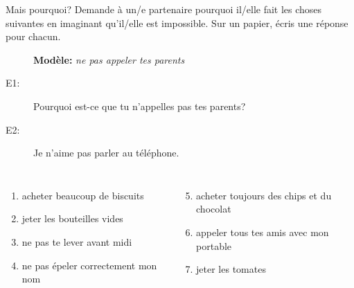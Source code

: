 \begin{frame}{Mais pourquoi?}
  Demande à un/e partenaire pourquoi il/elle fait les choses suivantes en imaginant qu'il/elle est impossible.
  Sur un papier, écris une réponse pour chacun. \\
  \begin{description}
    \item[] \textbf{Modèle:} \emph{ne pas appeler tes parents}
    \item[E1:] Pourquoi est-ce que tu n'appelles pas tes parents?
    \item[E2:] Je n'aime pas parler au téléphone.
  \end{description}
  \begin{columns}[t]
      \begin{enumerate}
        \item acheter beaucoup de biscuits
        \item jeter les bouteilles vides 
        \item ne pas te lever avant midi
        \item ne pas épeler correctement mon nom
      \end{enumerate}
      \begin{enumerate}
        \setcounter{enumi}{4}
        \item acheter toujours des chips et du chocolat
        \item appeler tous tes amis avec mon portable
        \item jeter les tomates
      \end{enumerate}
  \end{columns}
\end{frame}